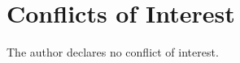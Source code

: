 \documentclass[10pt,twocolumn]{article}
\begin{document}
\section*{Conflicts of Interest}

The author declares no conflict of interest.



{\small
\setlength{\itemsep}{0pt}
\setlength{\parskip}{0pt}

}
\end{document}
